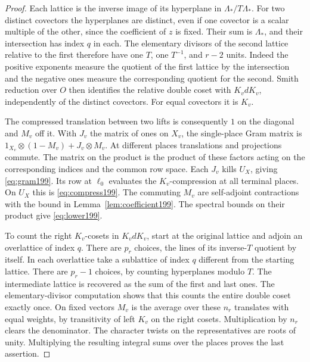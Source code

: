 \documentclass[a4paper,11pt]{article}
\theoremstyle{definition}
\theoremstyle{remark}
\numberwithin{equation}{section}
\begin{document}
\begin{proof}
Each lattice is the inverse image of its hyperplane in
\(\Lambda_*/T\Lambda_*\). For two distinct covectors the
hyperplanes are distinct, even if one covector is a scalar
multiple of the other, since the coefficient of \(z\) is fixed.
Their sum is \(\Lambda_*\), and their intersection has index
\(q\) in each. The elementary divisors of the second lattice
relative to the first therefore have one \(T\), one \(T^{-1}\),
and \(r-2\) units. Indeed the positive exponents measure the
quotient of the first lattice by the intersection and the
negative ones measure the corresponding quotient for the
second. Smith reduction over \(O\) then identifies the
relative double coset with \(K_vdK_v\), independently of
the distinct covectors. For equal covectors it is \(K_v\).

The compressed translation between two lifts is consequently
\(1\) on the diagonal and \(M_v\) off it. With \(J_v\) the
matrix of ones on \(X_v\), the single-place Gram matrix is
\(1_{X_v}\otimes(1-M_v)+J_v\otimes M_v\).
At different places translations and projections commute.
The matrix on the product is the product of these factors
acting on the corresponding indices and the common row space.
Each \(J_v\) kills \(U_X\), giving \eqref{eq:gram199}.
Its row at \(\ell_0\) evaluates the \(K_v\)-compression at
all terminal places. On \(U_X\) this is \eqref{eq:compress199}.
The commuting \(M_v\) are self-adjoint contractions with the
bound in Lemma~\ref{lem:coefficient199}. The spectral bounds
on their product give \eqref{eq:lower199}.

To count the right \(K_v\)-cosets in \(K_vdK_v\), start at
the original lattice and adjoin an overlattice of index \(q\).
There are \(p_r\) choices, the lines of its inverse-\(T\)
quotient by itself. In each overlattice take a sublattice of
index \(q\) different from the starting lattice. There are
\(p_r-1\) choices, by counting hyperplanes modulo \(T\).
The intermediate lattice is recovered as the sum of the first
and last ones. The elementary-divisor computation shows that
this counts the entire double coset exactly once. On fixed
vectors \(M_v\) is the average over these \(n_r\) translates
with equal weights, by transitivity of left \(K_v\) on the
right cosets. Multiplication by \(n_r\) clears the denominator.
The character twists on the representatives are roots of unity.
Multiplying the resulting integral sums over the places proves
the last assertion.
\end{proof}
\end{document}
